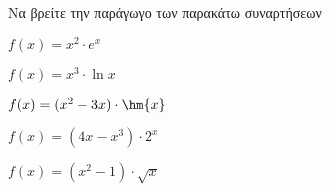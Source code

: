 Να βρείτε την παράγωγο των παρακάτω συναρτήσεων
\begin{alist}
\item $ f(x)=x^2\cdot e^x $
\item $ f(x)=x^3\cdot\ln{x} $
\item $ f(x)=(x^2-3x)\cdot \hm{x} $
\item $ f(x)=(4x-x^3)\cdot 2^x $
\item $ f(x)=(x^2-1)\cdot \sqrt{x} $
\end{alist}
